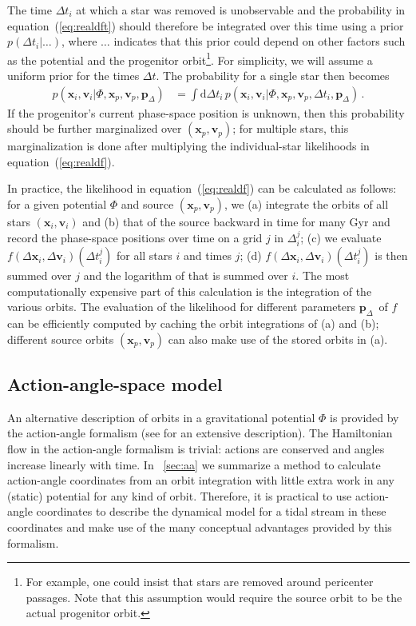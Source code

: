 \documentclass[12pt,preprint]{aastex}
\newcommand{\dd}{\mathrm{d}}
\newcommand{\eqnname}{equation}
\renewcommand{\vec}[1]{\ensuremath{\mathbf{#1}}}
\newcommand{\vecx}{\ensuremath{\vec{x}}}
\newcommand{\vecv}{\ensuremath{\vec{v}}}
\newcommand{\paramsdiff}{\ensuremath{\vec{p}_\Delta}}
\begin{document}
The time $\Delta t_i$ at which a star was removed is unobservable and
the probability in \eqnname~(\ref{eq:realdft}) should therefore be
integrated over this time using a prior $p(\Delta t_i|\ldots)$, where
$\ldots$ indicates that this prior could depend on other factors such
as the potential and the progenitor orbit\footnote{For example, one
  could insist that stars are removed around pericenter passages. Note
  that this assumption would require the source orbit to be the actual
  progenitor orbit.}. For simplicity, we will assume a uniform prior
for the times $\Delta t$. The probability for a single star then becomes
\begin{align}\label{eq:realdf}
  p(\vecx_i,\vecv_i | \Phi,\vecx_p,\vecv_p,\paramsdiff) & = \int \dd
  \Delta t_i \,p(\vecx_i,\vecv_i | \Phi,\vecx_p,\vecv_p,\Delta t_i,
  \paramsdiff)\,.
\end{align}
If the progenitor's current phase-space position is unknown, then this
probability should be further marginalized over $(\vecx_p,\vecv_p)$;
for multiple stars, this marginalization is done after multiplying the
individual-star likelihoods in \eqnname~(\ref{eq:realdf}).

In practice, the likelihood in \eqnname~(\ref{eq:realdf}) can be
calculated as follows: for a given potential $\Phi$ and source
$(\vecx_p,\vecv_p)$, we (a) integrate the orbits of all stars
$(\vecx_i,\vecv_i)$ and (b) that of the source backward in time for
many Gyr and record the phase-space positions over time on a grid $j$
in $\Delta^j_i$; (c) we evaluate $f(\Delta \vecx_i,\Delta
\vecv_i)(\Delta t^j_i)$ for all stars $i$ and times $j$; (d) $f(\Delta
\vecx_i,\Delta \vecv_i)(\Delta t^j_i)$ is then summed over $j$ and the
logarithm of that is summed over $i$. The most computationally
expensive part of this calculation is the integration of the various
orbits. The evaluation of the likelihood for different parameters
\paramsdiff\ of $f$ can be efficiently computed by caching the orbit
integrations of (a) and (b); different source orbits
$(\vecx_p,\vecv_p)$ can also make use of the stored orbits in (a).

\subsection{Action-angle-space model}\label{sec:aamethod}

An alternative description of orbits in a gravitational potential
$\Phi$ is provided by the action-angle formalism (see
\citealt{binneytremaine} for an extensive description). The
Hamiltonian flow in the action-angle formalism is trivial: actions are
conserved and angles increase linearly with time. In
\appendixname~\ref{sec:aa} we summarize a method to calculate
action-angle coordinates from an orbit integration with little extra
work in any (static) potential for any kind of orbit. Therefore, it is
practical to use action-angle coordinates to describe the dynamical
model for a tidal stream in these coordinates and make use of the many
conceptual advantages provided by this formalism.
\end{document}
